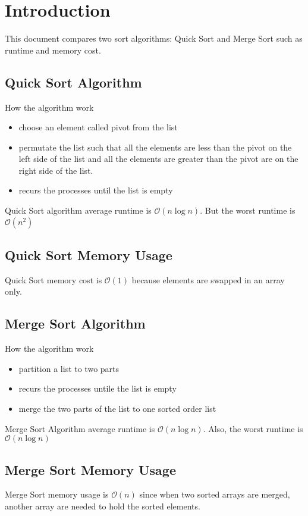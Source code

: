 \documentclass{article}
\begin{document}
\section{Introduction}
This document compares two sort algorithms: Quick Sort and Merge Sort such as runtime and memory cost.
\subsection{Quick Sort Algorithm} 
How the algorithm work
\begin{itemize}
\item choose an element called pivot from the list 
\item permutate the list such that all the elements are less than the pivot on the left side of the list and all the elements are greater than the pivot are on the right side of the list.
\item recurs the processes until the list is empty
\end{itemize} 

Quick Sort algorithm average runtime is $\mathcal{O}(n\log{}n)$.
But the worst runtime is $\mathcal{O}(n^2)$

\subsection{Quick Sort Memory Usage} 
Quick Sort memory cost is $\mathcal{O}(1)$
because elements are swapped in an array only.

\subsection{Merge Sort Algorithm} 
How the algorithm work
\begin{itemize}
\item partition a list to two parts 
\item recurs the processes untile the list is empty
\item merge the two parts of the list to one sorted order list 
\end{itemize} 
Merge Sort Algorithm average runtime is $\mathcal{O}(n\log{}n)$. Also, the worst runtime is $\mathcal{O}(n\log{}n)$

\subsection{Merge Sort Memory Usage} 
Merge Sort memory usage is $\mathcal{O}(n)$ since
when two sorted arrays are merged, another array are needed to hold the sorted elements. 
\end{document}
